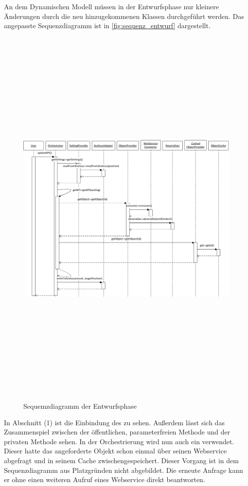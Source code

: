 \begin{onehalfspacing}
An dem Dynamischen Modell müssen in der Entwurfsphase nur kleinere Änderungen durch die neu hinzugekommenen Klassen durchgeführt werden. Das angepasste Sequenzdiagramm ist in \vref{fig:sequenz_entwurf} dargestellt.

\begin{figure}[!ht]
\centering
\setlength{\unitlength}{1mm}
\includegraphics[angle=90,height=197mm]{Visio/Entwurf-Sequenz.pdf}
\caption{Sequemzdiagramm der Entwurfsphase\label{fig:sequenz_entwurf}}
\end{figure}

In Abschnitt (1) ist die Einbindung des  zu sehen. Außerdem lässt sich das Zusammenspiel zwischen der öffentlichen, parameterfreien Methode  und der privaten Methode  sehen. In der Orchestrierung wird nun auch ein  verwendet. Dieser hatte das angeforderte Objekt schon einmal über seinen Webservice abgefragt und in seinem Cache zwischengespeichert. Dieser Vorgang ist in dem Sequenzdiagramm aus Platzgründen nicht abgebildet. Die erneute Anfrage kann er ohne einen weiteren Aufruf eines Webservice direkt beantworten.


\end{onehalfspacing}
